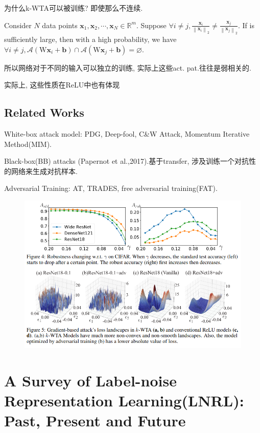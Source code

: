\documentclass{article}
\begin{document}
为什么k-WTA可以被训练? 即使那么不连续.

\begin{theorem}
    Consider $N$ data points $\boldsymbol{x}_{1}, \boldsymbol{x}_{2}, \cdots, \boldsymbol{x}_{N} \in \mathbb{R}^{m}$. Suppose $\forall i \neq j, \frac{\boldsymbol{x}_{i}}{\left\|\boldsymbol{x}_{i}\right\|_{2}} \neq \frac{\boldsymbol{x}_{j}}{\left\|\boldsymbol{x}_{j}\right\|_{2}} .$ If
    is sufficiently large, then with a high probability, we have $\forall i \neq j, \mathcal{A}\left(\mathrm{W} \boldsymbol{x}_{i}+\boldsymbol{b}\right) \cap \mathcal{A}\left(\mathrm{W} \boldsymbol{x}_{j}+\boldsymbol{b}\right)=\varnothing$.
\end{theorem}
所以网络对于不同的输入可以独立的训练, 实际上这些act. pat.往往是弱相关的.

实际上, 这些性质在ReLU中也有体现

\subsection{Related Works}

White-box attack model: PDG, Deep-fool, C\&W Attack, Momentum Iterative Method(MIM).

Black-box(BB) attacks (Papernot et al.,2017).基于transfer, 涉及训练一个对抗性的网络来生成对抗样本.

Adversarial Training: AT, TRADES, free adversarial training(FAT).
\begin{figure}[htbp]
    \centering
    \includegraphics[width=\textwidth]{kwta-facts.png}
\end{figure}

\section{A Survey of Label-noise Representation Learning(LNRL): Past, Present and Future}
\end{document}
